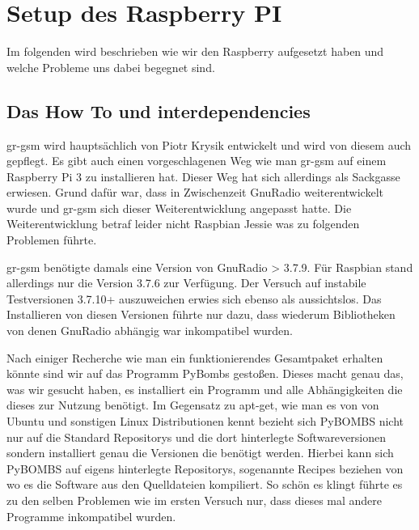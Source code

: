 %
%
\chapter{Setup des Raspberry PI}
Im folgenden wird beschrieben wie wir den Raspberry aufgesetzt haben und welche Probleme uns dabei begegnet sind.
\section{Das How To und interdependencies}

gr-gsm wird hauptsächlich von Piotr Krysik entwickelt und wird von diesem auch gepflegt. Es gibt auch einen vorgeschlagenen Weg wie man gr-gsm auf einem Raspberry Pi 3 zu installieren hat. Dieser Weg hat sich allerdings als Sackgasse erwiesen. Grund dafür war, dass in Zwischenzeit GnuRadio weiterentwickelt wurde und gr-gsm sich dieser Weiterentwicklung angepasst hatte. Die Weiterentwicklung betraf leider nicht Raspbian Jessie was zu folgenden Problemen führte.

gr-gsm benötigte damals eine Version von GnuRadio > 3.7.9. Für Raspbian stand allerdings nur die Version 3.7.6 zur Verfügung. Der Versuch auf instabile Testversionen 3.7.10+ auszuweichen erwies sich ebenso als aussichtslos. Das Installieren von diesen Versionen führte nur dazu, dass wiederum Bibliotheken von denen GnuRadio abhängig war inkompatibel wurden.

Nach einiger Recherche wie man ein funktionierendes Gesamtpaket erhalten könnte sind wir auf das Programm PyBombs gestoßen. Dieses macht genau das, was wir gesucht haben, es installiert ein Programm und alle Abhängigkeiten die dieses zur Nutzung benötigt. Im Gegensatz zu apt-get, wie man es von von Ubuntu und sonstigen Linux Distributionen kennt bezieht sich PyBOMBS nicht nur auf die Standard Repositorys und die dort hinterlegte Softwareversionen sondern installiert genau die Versionen die benötigt werden. Hierbei kann sich PyBOMBS auf eigens hinterlegte Repositorys, sogenannte Recipes beziehen von wo es die Software aus den Quelldateien kompiliert. 
So schön es klingt führte es zu den selben Problemen wie im ersten Versuch nur, dass dieses mal andere Programme inkompatibel wurden.


